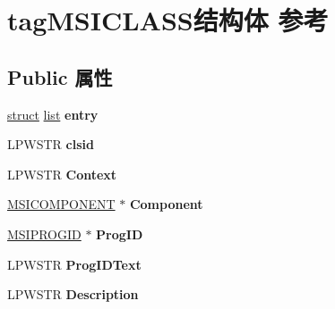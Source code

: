 \hypertarget{structtag_m_s_i_c_l_a_s_s}{}\section{tag\+M\+S\+I\+C\+L\+A\+S\+S结构体 参考}
\label{structtag_m_s_i_c_l_a_s_s}
\subsection*{Public 属性}
\begin{DoxyCompactItemize}
\item 
\mbox{\label{structtag_m_s_i_c_l_a_s_s_a9f631aeeeee997ebff4f314fafaedfc0}} 
\hyperlink{interfacestruct}{struct} \hyperlink{classlist}{list} {\bfseries entry}
\item 
\mbox{\label{structtag_m_s_i_c_l_a_s_s_a21d5ad451c5d74705ec4badffaea8b9d}} 
L\+P\+W\+S\+TR {\bfseries clsid}
\item 
\mbox{\label{structtag_m_s_i_c_l_a_s_s_ac39793d89a14eb4b4cc610c762910300}} 
L\+P\+W\+S\+TR {\bfseries Context}
\item 
\mbox{\label{structtag_m_s_i_c_l_a_s_s_ae43a00b89123ab3721e4f20123a7214f}} 
\hyperlink{structtag_m_s_i_c_o_m_p_o_n_e_n_t}{M\+S\+I\+C\+O\+M\+P\+O\+N\+E\+NT} $\ast$ {\bfseries Component}
\item 
\mbox{\label{structtag_m_s_i_c_l_a_s_s_aeb189b050289a122429e6426e1243cf1}} 
\hyperlink{structtag_m_s_i_p_r_o_g_i_d}{M\+S\+I\+P\+R\+O\+G\+ID} $\ast$ {\bfseries Prog\+ID}
\item 
\mbox{\label{structtag_m_s_i_c_l_a_s_s_a4d085854b105f054d2f12f718479988c}} 
L\+P\+W\+S\+TR {\bfseries Prog\+I\+D\+Text}
\item 
\mbox{\label{structtag_m_s_i_c_l_a_s_s_ab9ef664d25a61a1489d144d6876d7a07}} 
L\+P\+W\+S\+TR {\bfseries Description}
\item 
\mbox{\label{structtag_m_s_i_c_l_a_s_s_a835a8f7c6575ed35536d9ac178baac7f}} 

\end{DoxyCompactItemize}
